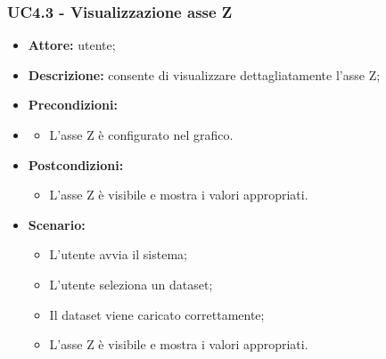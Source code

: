 \subsubsection{UC4.3 - Visualizzazione asse Z}
\begin{itemize}
    \item \textbf{Attore:} utente;
    \item \textbf{Descrizione:} consente di visualizzare dettagliatamente l'asse Z;
    \item \textbf{Precondizioni:} 
    \item \begin{itemize}
        \item L'asse Z è configurato nel grafico.
    \end{itemize}
    \item \textbf{Postcondizioni:} 
    \begin{itemize}
        \item L'asse Z è visibile e mostra i valori appropriati.
    \end{itemize}
    \item \textbf{Scenario:} 
    \begin{itemize}
        \item L'utente avvia il sistema;
        \item L'utente seleziona un dataset;
        \item Il dataset viene caricato correttamente;
        \item L'asse Z è visibile e mostra i valori appropriati.
    \end{itemize}
\end{itemize}
\newpage
